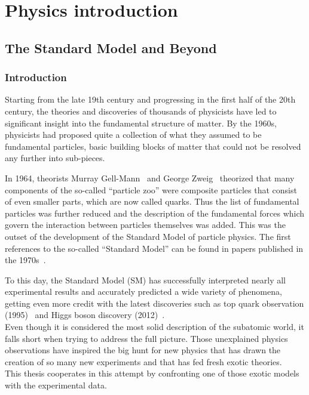 \part{Physics introduction}
\chapter{The Standard Model and Beyond} \label{Chapter1} 

\section{Introduction}
Starting from the late 19th century and progressing in the first half of the 20th century, 
the theories and discoveries of thousands of physicists have led to significant insight into the fundamental structure of matter. 
By the 1960s, physicists had proposed quite a collection of what they assumed to be fundamental particles, basic building blocks of matter that could not be resolved any further into sub-pieces. 

In 1964, theorists Murray Gell-Mann~\cite{GELLMANN1964214} and George Zweig~\cite{Zweig:570209} theorized that many components of the so-called ``particle zoo'' were composite particles that consist of even smaller parts, which are now called quarks. Thus the list of fundamental particles was further reduced and the description of the fundamental forces which govern the interaction between particles themselves was added. This was the outset of the development of the Standard Model of particle physics.
The first references to the so-called “Standard Model” can be found in papers published in the 1970s~\cite{Pais:1975gn,PhysRevD.13.680}.

To this day, the Standard Model (SM) has successfully interpreted nearly all experimental results and accurately predicted a wide variety of phenomena, getting even more credit with the latest discoveries such as top quark observation (1995)~\cite{Abachi_1995} and Higgs boson discovery (2012)~\cite{20121,201230}.\\
Even though it is considered the most solid description of the subatomic world, it falls short when trying to address the full picture. Those unexplained physics observations have inspired the big hunt for new physics that has drawn the creation of so many new experiments and that has fed fresh exotic theories. \\
This thesis cooperates in this attempt by confronting one of those exotic models with the experimental data. 


